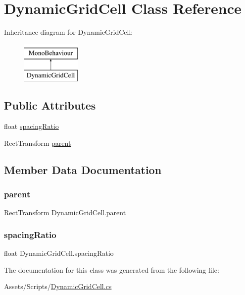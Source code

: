\hypertarget{classDynamicGridCell}{}\section{Dynamic\+Grid\+Cell Class Reference}
\label{classDynamicGridCell}
Inheritance diagram for Dynamic\+Grid\+Cell\+:\begin{figure}[H]
\begin{center}
\leavevmode
\includegraphics[height=2.000000cm]{classDynamicGridCell}
\end{center}
\end{figure}
\subsection*{Public Attributes}
\begin{DoxyCompactItemize}
\item 
float \hyperlink{classDynamicGridCell_aced25c1dbf98335be99bfecb7eb7a7a0}{spacing\+Ratio}
\item 
Rect\+Transform \hyperlink{classDynamicGridCell_a71f86a065e2c8533d93eb9ecd0ec009f}{parent}
\end{DoxyCompactItemize}


\subsection{Member Data Documentation}
\mbox{\label{classDynamicGridCell_a71f86a065e2c8533d93eb9ecd0ec009f}} 
\subsubsection{\texorpdfstring{parent}{parent}}
{\footnotesize\ttfamily Rect\+Transform Dynamic\+Grid\+Cell.\+parent}

\mbox{\label{classDynamicGridCell_aced25c1dbf98335be99bfecb7eb7a7a0}} 
\subsubsection{\texorpdfstring{spacing\+Ratio}{spacingRatio}}
{\footnotesize\ttfamily float Dynamic\+Grid\+Cell.\+spacing\+Ratio}



The documentation for this class was generated from the following file\+:\begin{DoxyCompactItemize}
\item 
Assets/\+Scripts/\hyperlink{DynamicGridCell_8cs}{Dynamic\+Grid\+Cell.\+cs}\end{DoxyCompactItemize}

